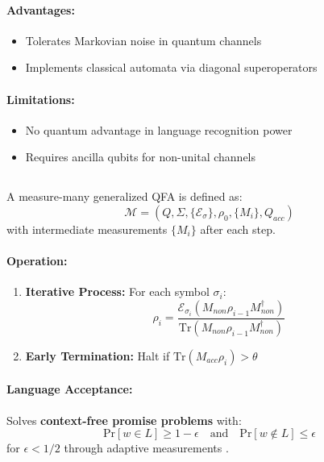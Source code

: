 \paragraph{Advantages:}
\begin{itemize}
    \item Tolerates Markovian noise in quantum channels
    \item Implements classical automata via diagonal superoperators
\end{itemize}

\paragraph{Limitations:}
\begin{itemize}
    \item No quantum advantage in language recognition power
    \item Requires ancilla qubits for non-unital channels
\end{itemize}

\subsection{}
\label{subsec:mm-1gqfa}

\begin{definition}
A measure-many generalized QFA is defined as:
\[
\mathcal{M} = (Q, \Sigma, \{\mathcal{E}_\sigma\}, \rho_0, \{M_i\}, Q_{acc})
\]
with intermediate measurements $\{M_i\}$ after each step.
\end{definition}

\paragraph{Operation:}
\begin{enumerate}
    \item \textbf{Iterative Process:} For each symbol $\sigma_i$:
    \[
    \rho_i = \frac{\mathcal{E}_{\sigma_i}(M_{non}\rho_{i-1}M_{non}^\dagger)}{\text{Tr}(M_{non}\rho_{i-1}M_{non}^\dagger)}
    \]
    \item \textbf{Early Termination:} Halt if $\text{Tr}(M_{acc}\rho_i) > \theta$
\end{enumerate}

\paragraph{Language Acceptance:}
Solves \textbf{context-free promise problems} with:
\[
\text{Pr}[w \in L] \geq 1-\epsilon \quad \text{and} \quad \text{Pr}[w \notin L] \leq \epsilon
\]
for $\epsilon < 1/2$ through adaptive measurements \cite{hirvensalo2012quantum}.

